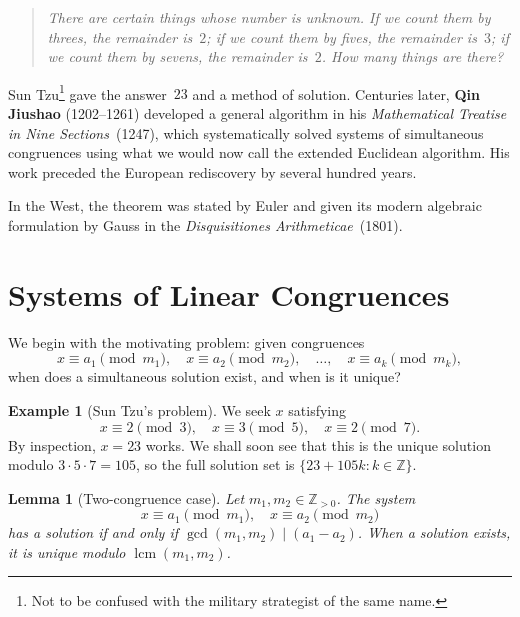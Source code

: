\documentclass[12pt,a4paper,openany]{book}
\theoremstyle{definition}
\newtheorem{example}[definition]{Example}
\theoremstyle{plain}
\newtheorem{lemma}[definition]{Lemma}
\theoremstyle{remark}
\newcommand{\Z}{\mathbb{Z}}
\DeclareMathOperator{\lcm}{lcm}
\begin{document}
\begin{quote}
\itshape
There are certain things whose number is unknown. If we count them by threes, the
remainder is~$2$; if we count them by fives, the remainder is~$3$; if we count them by
sevens, the remainder is~$2$. How many things are there?
\end{quote}

Sun Tzu\footnote{Not to be confused with the military strategist of the same name.}
gave the answer~$23$ and a method of solution.
Centuries later, \textbf{Qin Jiushao} (1202--1261) developed
a general algorithm in his \emph{Mathematical Treatise in Nine Sections}~(1247),
which systematically solved systems of simultaneous congruences using what we would now
call the extended Euclidean algorithm. His work preceded the European rediscovery
by several hundred years.

In the West, the theorem was stated by Euler and
given its modern algebraic formulation by Gauss
in the \emph{Disquisitiones Arithmeticae}~(1801).

\section{Systems of Linear Congruences}
\label{sec:crt-systems}

We begin with the motivating problem: given congruences
\[
  x \equiv a_1 \pmod{m_1}, \quad
  x \equiv a_2 \pmod{m_2}, \quad \ldots, \quad
  x \equiv a_k \pmod{m_k},
\]
when does a simultaneous solution exist, and when is it unique?

\begin{example}[Sun Tzu's problem]
\label{ex:sun-tzu}
We seek $x$ satisfying
\[
  x \equiv 2 \pmod{3}, \quad
  x \equiv 3 \pmod{5}, \quad
  x \equiv 2 \pmod{7}.
\]
By inspection, $x = 23$ works. We shall soon see that this is the unique solution
modulo $3 \cdot 5 \cdot 7 = 105$, so the full solution set is $\{23 + 105k : k \in \Z\}$.
\end{example}

\begin{lemma}[Two-congruence case]
\label{lem:two-congruences}
Let $m_1, m_2 \in \Z_{>0}$. The system
\[
  x \equiv a_1 \pmod{m_1}, \quad x \equiv a_2 \pmod{m_2}
\]
has a solution if and only if $\gcd(m_1, m_2) \mid (a_1 - a_2)$.
When a solution exists, it is unique modulo $\lcm(m_1, m_2)$.
\end{lemma}
\end{document}
